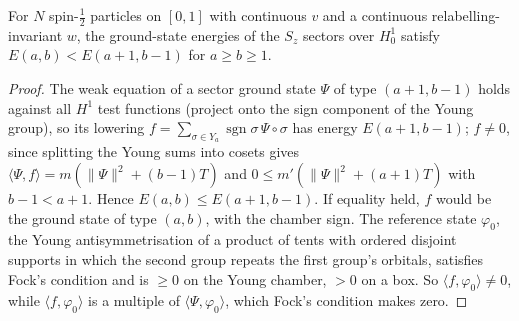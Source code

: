 \begin{theorem}
  \label{thm:lieb_mattis_W_cont}
  \leanok
  For $N$ spin-$\frac12$ particles on $[0,1]$ with continuous $v$ and a continuous relabelling-invariant $w$, the
  ground-state energies of the $S_z$ sectors over $H^1_0$ satisfy $E(a,b)<E(a+1,b-1)$ for $a\ge b\ge1$.
\end{theorem}
\begin{proof}
  \leanok
  The weak equation of a sector ground state $\Psi$ of type $(a+1,b-1)$ holds against all $H^1$ test functions
  (project onto the sign component of the Young group), so its lowering $f=\sum_{\sigma\in Y_a}\operatorname{sgn}\sigma\,
  \Psi\circ\sigma$ has energy $E(a+1,b-1)$; $f\ne0$, since splitting the Young sums into cosets gives
  $\langle\Psi,f\rangle=m(\|\Psi\|^2+(b-1)T)$ and $0\le m'(\|\Psi\|^2+(a+1)T)$ with $b-1<a+1$. Hence $E(a,b)\le E(a+1,b-1)$.
  If equality held, $f$ would be the ground state of type $(a,b)$, with the chamber sign. The reference state
  $\varphi_0$, the Young antisymmetrisation of a product of tents with ordered disjoint supports in which the second
  group repeats the first group's orbitals, satisfies Fock's condition and is $\ge0$ on the Young chamber, $>0$ on a
  box. So $\langle f,\varphi_0\rangle\ne0$, while $\langle f,\varphi_0\rangle$ is a multiple of $\langle\Psi,\varphi_0\rangle$, which
  Fock's condition makes zero.
\end{proof}


